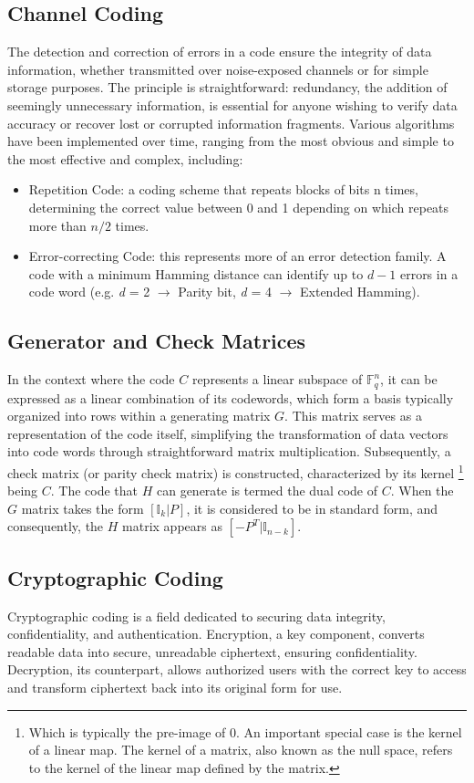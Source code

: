 \subsection{Channel Coding}
The detection and correction of errors in a code ensure the integrity of data information, whether transmitted over noise-exposed channels or for simple storage purposes. The principle is straightforward: redundancy, the addition of seemingly unnecessary information, is essential for anyone wishing to verify data accuracy or recover lost or corrupted information fragments. Various algorithms have been implemented over time, ranging from the most obvious and simple to the most effective and complex, including:
\begin{itemize}
    \item Repetition Code: a coding scheme that repeats blocks of bits n times, determining the correct value between 0 and 1 depending on which repeats more than $n/2$ times.
    \item Error-correcting Code: this represents more of an error detection family. A code with a minimum Hamming distance can identify up to $d - 1$ errors in a code word (e.g. \textit{d} = 2 $\rightarrow$ Parity bit, \textit{d} = 4 $\rightarrow$ Extended Hamming).
\end{itemize}

\subsection{Generator and Check Matrices}
In the context where the code $C$ represents a linear subspace of $\mathbb{F}_q^n$, it can be expressed as a linear combination of its codewords, which form a basis typically organized into rows within a generating matrix $G$. This matrix serves as a representation of the code itself, simplifying the transformation of data vectors into code words through straightforward matrix multiplication. Subsequently, a check matrix (or parity check matrix) is constructed, characterized by its kernel \footnote{Which is typically the pre-image of 0. An important special case is the kernel of a linear map. The kernel of a matrix, also known as the null space, refers to the kernel of the linear map defined by the matrix.} being $C$. The code that $H$ can generate is termed the dual code of $C$. When the $G$ matrix takes the form $[\mathbb{I}_k | P]$, it is considered to be in standard form, and consequently, the $H$ matrix appears as $[-P^T | \mathbb{I}_{n-k}]$.

\subsection{Cryptographic Coding}
Cryptographic coding is a field dedicated to securing data integrity, confidentiality, and authentication. Encryption, a key component, converts readable data into secure, unreadable ciphertext, ensuring confidentiality. Decryption, its counterpart, allows authorized users with the correct key to access and transform ciphertext back into its original form for use.

